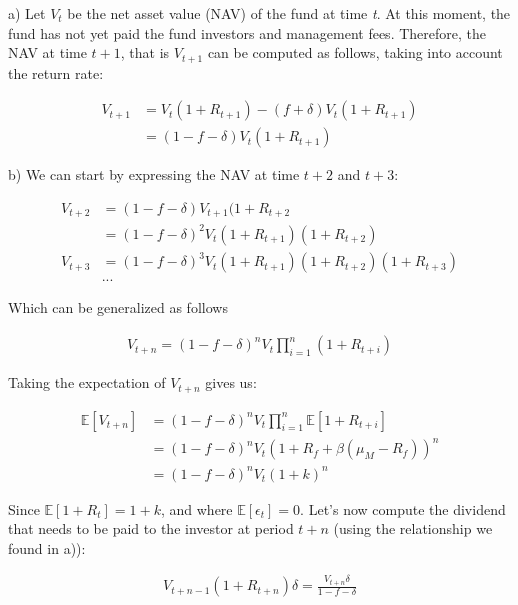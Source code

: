 \documentclass[10pt]{article}
\newenvironment{exercise}[2][Exercise]{\begin{trivlist}
  \item[\hskip \labelsep {\bfseries #1}\hskip \labelsep {\bfseries #2.}]}{\end{trivlist}}
\begin{document}
\newpage

\begin{exercise}{2. Closed-end funds}
\end{exercise}

a) Let $V_t$ be the net asset value (NAV) of the fund at time \textit{t}. At this moment, the fund has not yet paid the fund investors and management fees. Therefore, the NAV at time $t+1$, that is $V_{t+1}$ can be computed as follows, taking into account the return rate:

\begin{align*}
	V_{t+1} &= V_t(1 + R_{t+1}) - (f + \delta)V_t(1 + R_{t+1})\\
	&= (1 - f - \delta)V_t(1 + R_{t+1})
\end{align*}

b) We can start by expressing the NAV at time $t+2$ and $t+3$:

\begin{align*}
	V_{t+2} &= (1-f-\delta)V_{t+1}(1 + R_{t+2}\\
	&= (1-f-\delta)^2V_t(1 + R_{t+1})(1 + R_{t+2})\\
	V_{t+3} &= (1-f-\delta)^3 V_t (1+R_{t+1})(1+R_{t+2})(1+R_{t+3})\\
	&...
\end{align*}

Which can be generalized as follows

\begin{align*}
	V_{t+n} = (1-f-\delta)^n V_t \prod^n_{i=1}(1 + R_{t+i})
\end{align*}

Taking the expectation of $V_{t+n}$ gives us:

\begin{align*}
	\mathbb{E}[V_{t+n}] &= (1 - f - \delta)^n V_t \prod^n_{i=1} \mathbb{E}[1 + R_{t+i}]\\
	&= (1 - f - \delta)^n V_t \left(1 + R_f +\beta (\mu_M - R_f)\right)^n\\
	&= (1 - f - \delta)^n V_t (1 + k)^n
\end{align*}

Since $\mathbb{E}[1 + R_t] = 1 + k$, and where $\mathbb{E}[\epsilon_t] = 0$. Let's now compute the dividend that needs to be paid to the investor at period $t+n$ (using the relationship we found in a)):

\begin{align*}
	V_{t+n-1}(1+R_{t+n})\delta = \frac{V_{t+n}\delta}{1 - f - \delta}
\end{align*}
\end{document}
